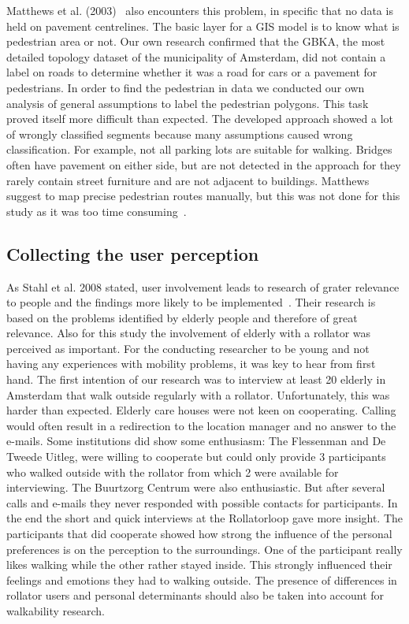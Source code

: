 Matthews et al. (2003)~\cite{Matthews2003} also encounters this problem, in specific that no data is held on pavement centrelines. The basic layer for a GIS model is to know what is pedestrian area or not. Our own research confirmed that the GBKA, the most detailed topology dataset of the municipality of Amsterdam, did not contain a label on roads to determine whether it was a road for cars or a pavement for pedestrians. In order to find the pedestrian in data we conducted our own analysis of general assumptions to label the pedestrian polygons. This task proved itself more difficult than expected. The developed approach showed a lot of wrongly classified segments because many assumptions caused wrong classification. For example, not all parking lots are suitable for walking. Bridges often have pavement on either side, but are not detected in the approach for they rarely contain street furniture and are not adjacent to buildings. Matthews suggest to map precise pedestrian routes manually, but this was not done for this study as it was too time consuming~\cite{Matthews2003}.

\subsection{Collecting the user perception}
As Stahl et al. 2008 stated, user involvement leads to research of grater relevance to people and the findings more likely to be implemented~\cite{Stahl2008}. Their research is based on the problems identified by elderly people and therefore of great relevance. Also for this study the involvement of elderly with a rollator was perceived as important. For the conducting researcher to be young and not having any experiences with mobility problems, it was key to hear from first hand. The first intention of our research was to interview at least 20 elderly in Amsterdam that walk outside regularly with a rollator. Unfortunately, this was harder than expected. Elderly care houses were not keen on cooperating. Calling would often result in a redirection to the location manager and no answer to the e-mails. Some institutions did show some enthusiasm: The Flessenman and De Tweede Uitleg, were willing to cooperate but could only provide 3 participants who walked outside with the rollator from which 2 were available for interviewing. The Buurtzorg Centrum were also enthusiastic. But after several calls and e-mails they never responded with possible contacts for participants. In the end the short and quick interviews at the Rollatorloop gave more insight. The participants that did cooperate showed how strong the influence of the personal preferences is on the perception to the surroundings. One of the participant really likes walking while the other rather stayed inside. This strongly influenced their feelings and emotions they had to walking outside. The presence of differences in rollator users and personal determinants should also be taken into account for walkability research. 

